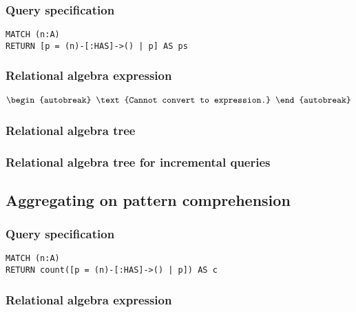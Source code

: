 \subsubsection*{Query specification}

\begin{lstlisting}
MATCH (n:A)
RETURN [p = (n)-[:HAS]->() | p] AS ps
\end{lstlisting}

\subsubsection*{Relational algebra expression}

\begin{align*}
\begin{autobreak}
\text{Cannot convert to expression.}
\end{autobreak}
\end{align*}

\subsubsection*{Relational algebra tree}


\subsubsection*{Relational algebra tree for incremental queries}


\subsection{Aggregating on pattern comprehension}

\subsubsection*{Query specification}

\begin{lstlisting}
MATCH (n:A)
RETURN count([p = (n)-[:HAS]->() | p]) AS c
\end{lstlisting}

\subsubsection*{Relational algebra expression}

